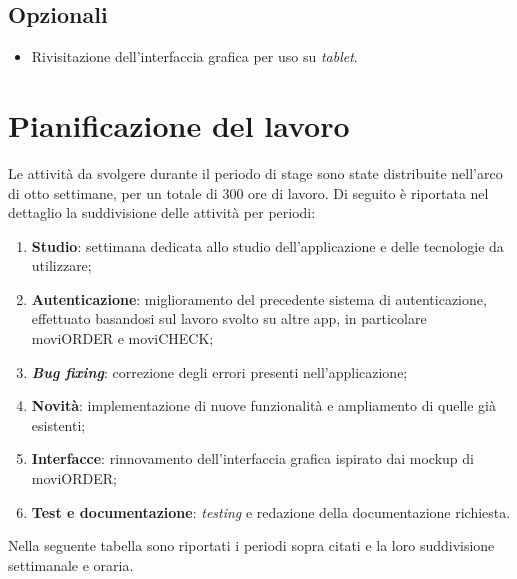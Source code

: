 \subsection{Opzionali}

\begin{itemize}
    \item Rivisitazione dell'interfaccia grafica per uso su \textit{tablet}.
\end{itemize}


\section{Pianificazione del lavoro}

Le attività da svolgere durante il periodo di stage sono state distribuite nell'arco di otto settimane, per un totale di 300 ore di lavoro. Di seguito è riportata nel dettaglio la suddivisione delle attività per periodi:
\begin{enumerate}
    \item \textbf{Studio}: settimana dedicata allo studio dell'applicazione e delle tecnologie da utilizzare;
    \item \textbf{Autenticazione}: miglioramento del precedente sistema di autenticazione, effettuato basandosi sul lavoro svolto su altre app, in particolare moviORDER e moviCHECK;
    \item \textbf{\textit{Bug fixing}}: correzione degli errori presenti nell'applicazione;
    \item \textbf{Novità}: implementazione di nuove funzionalità e ampliamento di quelle già esistenti;
    \item \textbf{Interfacce}: rinnovamento dell'interfaccia grafica ispirato dai mockup di moviORDER;
    \item \textbf{Test e documentazione}: \emph{testing} e redazione della documentazione richiesta.
\end{enumerate}
Nella seguente tabella sono riportati i periodi sopra citati e la loro suddivisione settimanale e oraria.

